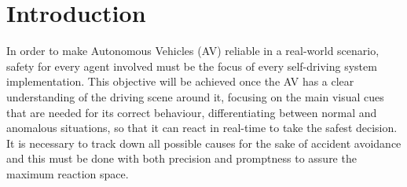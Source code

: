 \section{Introduction}

In order to make Autonomous Vehicles (AV) reliable in a real-world scenario, safety for every agent involved must be the focus of every self-driving system implementation.
This objective will be achieved once the AV has a clear understanding of the driving scene around it, focusing on the main visual cues that are needed for its correct behaviour, differentiating between normal and anomalous situations, so that it can react in real-time to take the safest decision.
It is necessary to track down all possible causes for the sake of accident avoidance and this must be done with both precision and promptness to assure the maximum reaction space.


